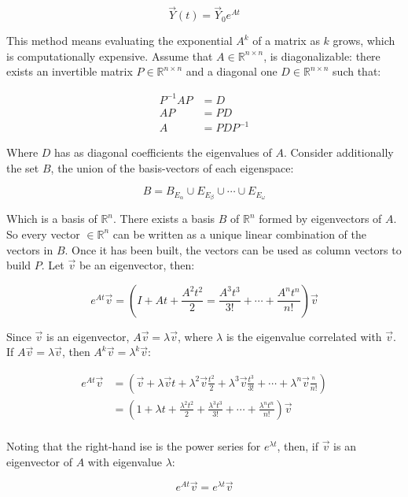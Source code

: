   $$\vec{Y}(t) = \vec{Y}_0e^{At}$$

  This method means evaluating the exponential $A^k$ of a matrix as $k$ grows, which is computationally expensive.
  Assume that $A\in\mathbb{R}^{n\times n}$, is diagonalizable: there exists an invertible matrix $P\in\mathbb{R}^{n\times n}$ and a diagonal one $D\in\mathbb{R}^{n\times n}$ such that:

  \begin{align*}
    P^{-1}AP &= D\\
    AP &= PD\\
    A &= PDP^{-1}
  \end{align*}

  Where $D$ has as diagonal coefficients the eigenvalues of $A$.
  Consider additionally the set $B$, the union of the basis-vectors of each eigenspace:

  $$B = B_{E_\alpha} \cup E_{E_\beta} \cup \cdots \cup E_{E_\omega}$$

  Which is a basis of $\mathbb{R}^n$.
  There exists a basis $B$ of $\mathbb{R}^n$ formed by eigenvectors of $A$.
  So every vector $\in\mathbb{R}^n$ can be written as a unique linear combination of the vectors in $B$.
  Once it has been built, the vectors can be used as column vectors to build $P$.
  Let $\vec{v}$ be an eigenvector, then:

  $$e^{At}\vec{v} = \left(I + At + \frac{A^2t^2}{2} = \frac{A^3t^3}{3!} + \cdots + \frac{A^nt^n}{n!}\right)\vec{v}$$

  Since $\vec{v}$ is an eigenvector, $A\vec{v} = \lambda\vec{v}$, where $\lambda$ is the eigenvalue correlated with $\vec{v}$.
  If $A\vec{v} = \lambda\vec{v}$, then $A^k\vec{v} = \lambda^k\vec{v}$:

  \begin{align*}
    e^{At}\vec{v} &=\left(\vec{v} + \lambda\vec{v}t + \lambda^2\vec{v}\frac{t^2}{2} + \lambda^3\vec{v}\frac{t^3}{3!} + \cdots + \lambda^n\vec{v}\frac{^n}{n!}\right)\\
                  &= \left(1 + \lambda t + \frac{\lambda^2t^2}{2} + \frac{\lambda^3t^3}{3!} + \cdots + \frac{\lambda^nt^n}{n!}\right)\vec{v}\\
  \end{align*}

  Noting that the right-hand ise is the power series for $e^{\lambda t}$, then, if $\vec{v}$ is an eigenvector of $A$ with eigenvalue $\lambda$:

  $$e^{At}\vec{v} = e^{\lambda t}\vec{v}$$

